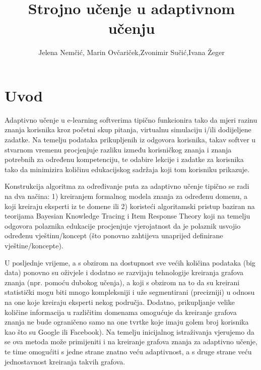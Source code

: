 \documentclass[times, utf8,projekt]{fer}
\begin{document}

\title{Strojno učenje u adaptivnom učenju}

\author{Jelena Nemčić, Marin Ovčariček,Zvonimir Sučić,Ivana Žeger}

\maketitle
\chapter{Uvod}
Adaptivno učenje u e-learning softverima tipično funkcionira tako da mjeri razinu znanja korisnika kroz početni skup pitanja, virtualnu simulaciju i/ili dodijeljene zadatke. Na temelju podataka prikupljenih iz odgovora korisnika, takav softver u stvarnom vremenu procjenjuje razliku između korisničkog znanja i znanja potrebnih za određenu kompetenciju, te odabire lekcije i zadatke za korisnika tako da minimizira količinu edukacijskog sadržaja koji tom korisniku prikazuje.

Konstrukcija algoritma za određivanje puta za adaptivno učenje tipično se radi na dva načina: 1) kreiranjem formalnog modela znanja za određenu domenu, a koji kreiraju eksperti iz te domene ili 2) koristeći algoritamski pristup baziran na teorijama Bayesian Knowledge Tracing i Item Response Theory koji na temelju odgovora polaznika edukacije procjenjuje vjerojatnost da je polaznik usvojio određenu vještinu/koncept (što ponovno zahtijeva unaprijed definirane vještine/koncepte).

U posljednje vrijeme, a s obzirom na dostupnost sve većih količina podataka (big data) ponovno su oživjele i dodatno se razvijaju tehnologije kreiranja grafova znanja (npr. pomoću dubokog učenja), a koji s obzirom na to da su kreirani statistički mogu biti mnogo kompleksniji i uže segmentirani (precizniji) u odnosu na one koje kreiraju eksperti nekog područja. Dodatno, prikupljanje velike količine informacija u različitim domenama omogućuje da kreiranje grafova znanja ne bude ograničeno samo na one tvrtke koje imaju golem broj korisnika kao što su Google ili Facebook). Na temelju inicijalnog istraživanja vjerujemo da se ova metoda može primijeniti i na kreiranje grafova znanja za adaptivno učenje, te time omogućiti s jedne strane znatno veću adaptivnost, a s druge strane veću jednostavnost kreiranja takvih grafova.
\end{document}
